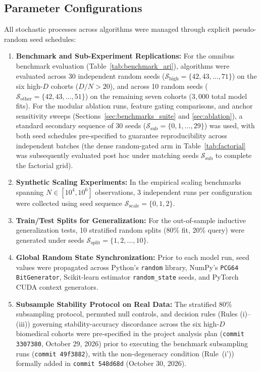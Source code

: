\documentclass[pdflatex,sn-mathphys-num]{sn-jnl}
\theoremstyle{thmstyleone}
\theoremstyle{thmstyletwo}
\theoremstyle{thmstylethree}
\begin{document}
\subsection{Parameter Configurations}\label{sec:setup_params}\label{sec:setup_parameters}
All stochastic processes across algorithms were managed through explicit pseudo-random seed schedules:
\begin{enumerate}
 \item \textbf{Benchmark and Sub-Experiment Replications:} For the omnibus benchmark evaluation (Table~\ref{tab:benchmark_ari}), algorithms were evaluated across 30 independent random seeds ($\mathcal{S}_{\text{high}} = \{42, 43, \dots, 71\}$) on the six high-$D$ cohorts ($D/N > 20$), and across 10 random seeds ($\mathcal{S}_{\text{other}} = \{42, 43, \dots, 51\}$) on the remaining seven cohorts ($3{,}000$ total model fits). For the modular ablation runs, feature gating comparisons, and anchor sensitivity sweeps (Sections~\ref{sec:benchmarks_suite} and \ref{sec:ablation}), a standard secondary sequence of 30 seeds ($\mathcal{S}_{\text{sub}} = \{0, 1, \dots, 29\}$) was used, with both seed schedules pre-specified to guarantee reproducibility across independent batches (the dense random-gated arm in Table~\ref{tab:factorial} was subsequently evaluated post hoc under matching seeds $\mathcal{S}_{\text{sub}}$ to complete the factorial grid).
 \item \textbf{Synthetic Scaling Experiments:} In the empirical scaling benchmarks spanning $N \in [10^4, 10^6]$ observations, 3 independent runs per configuration were collected using seed sequence $\mathcal{S}_{\text{scale}} = \{0, 1, 2\}$.
 \item \textbf{Train/Test Splits for Generalization:} For the out-of-sample inductive generalization tests, 10 stratified random splits (80\% fit, 20\% query) were generated under seeds $\mathcal{S}_{\text{split}} = \{1, 2, \dots, 10\}$.
 \item \textbf{Global Random State Synchronization:} Prior to each model run, seed values were propagated across Python's \texttt{random} library, NumPy's \texttt{PCG64} \texttt{BitGenerator}, Scikit-learn estimator \texttt{random\_state} seeds, and PyTorch CUDA context generators.
 \item \textbf{Subsample Stability Protocol on Real Data:} The stratified $80\%$ subsampling protocol, permuted null controls, and decision rules (Rules (i)--(iii)) governing stability-accuracy discordance across the six high-$D$ biomedical cohorts were pre-specified in the project analysis plan (\texttt{commit 3307380}, October 29, 2026) prior to executing the benchmark subsampling runs (\texttt{commit 49f3882}), with the non-degeneracy condition (Rule~(i')) formally added in \texttt{commit 548d68d} (October 30, 2026).
\end{enumerate}
\end{document}
